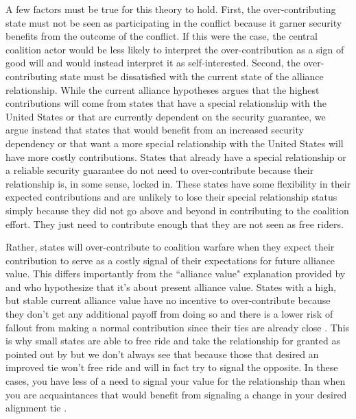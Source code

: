 \documentclass[12pt,letterpaper]{article}
\begin{document}
		A few factors must be true for this theory to hold. First, the over-contributing state must not be seen as participating in the conflict because it garner security benefits from the outcome of the conflict. If this were the case, the central coalition actor would be less likely to interpret the over-contribution as a sign of good will and would instead interpret it as self-interested. Second, the over-contributing state must be dissatisfied with the current state of the alliance relationship. While the current alliance hypotheses argues that the highest contributions will come from states that have a special relationship with the United States or that are currently dependent on the security guarantee, we argue instead that states that would benefit from an increased security dependency or that want a more special relationship with the United States will have more costly contributions. States that already have a special relationship or a reliable security guarantee do not need to over-contribute because their relationship is, in some sense, locked in. These states have some flexibility in their expected contributions and are unlikely to lose their special relationship status simply because they did not go above and beyond in contributing to the coalition effort. They just need to contribute enough that they are not seen as free riders.

		Rather, states will over-contribute to coalition warfare when they expect their contribution to serve as a costly signal of their expectations for future alliance value. This differs importantly from the ``alliance value" explanation provided by \citet{davidson_americaallieswar_2011} and \citet{massie_democraticalliesfollowership_2016} who hypothesize that it's about present alliance value. States with a high, but stable current alliance value have no incentive to over-contribute because they don't get any additional payoff from doing so and there is a lower risk of fallout from making a normal contribution since their ties are already close \citep{davidson_headingexitsdemocratic_2014}. This is why small states are able to free ride and take the relationship for granted as pointed out by \citet{keohane_biginfluencesmall_1971} but we don't always see that because those that desired an improved tie won't free ride and will in fact try to signal the opposite. In these cases, you have less of a need to signal your value for the relationship than when you are acquaintances that would benefit from signaling a change in your desired alignment tie \citep{gartzke_contractsfriendsalliances_2012, gibler_priorcommitmentscompatible_2004}.
\end{document}
